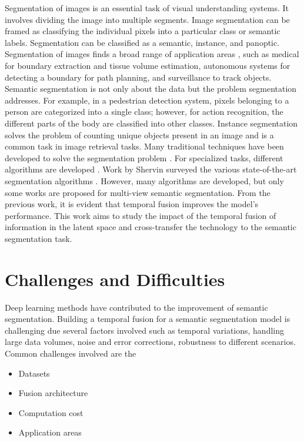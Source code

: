 	Segmentation of images is an essential task of visual understanding systems. It involves dividing the image into multiple segments. Image segmentation can be framed as classifying the individual pixels into a particular class or semantic labels. Segmentation can be classified as a semantic, instance, and panoptic. Segmentation of images finds a broad range of application areas \cite{21_forsyth2011computer}, such as medical for boundary extraction and tissue volume estimation, autonomous systems for detecting a boundary for path planning, and surveillance to track objects. Semantic segmentation is not only about the data but the problem segmentation addresses. For example, in a pedestrian detection system, pixels belonging to a person are categorized into a single class; however, for action recognition, the different parts of the body are classified into other classes. Instance segmentation \cite{22_dai2016instance} solves the problem of counting unique objects present in an image and is a common task in image retrieval tasks. Many traditional techniques have been developed to solve the segmentation problem \cite{23_fu1981survey}. For specialized tasks, different algorithms are developed \cite{24_ladys1994colour}. Work by Shervin surveyed the various state-of-the-art segmentation algorithms \cite{25_minaee2021image}. However, many algorithms are developed, but only some works are proposed for multi-view semantic segmentation. From the previous work, it is evident that temporal fusion improves the model's performance. This work aims to study the impact of the temporal fusion of information in the latent space and cross-transfer the technology to the semantic segmentation task. 

    \section{Challenges and Difficulties}
    
	Deep learning methods have contributed to the improvement of semantic segmentation. Building a temporal fusion for a semantic segmentation model is challenging due several factors involved such as temporal variations, handling large data volumes, noise and error corrections, robustness to different scenarios. Common challenges involved are the 
   
    \begin{itemize}
    	\setlength\itemsep{0.01em}
    	\item Datasets
    	\item Fusion architecture
    	\item Computation cost
    	\item Application areas
    \end{itemize}
	
